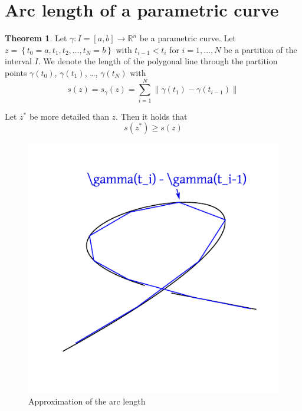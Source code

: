 \documentclass[a4paper,landscape,twocolumn]{article}
\theoremstyle{definition}
\newtheorem{theorem}{Theorem}
\newcommand\set[1]{\left\{#1\right\}}
\newcommand\norm[1]{\left\|#1\right\|}
\begin{document}
\section{Arc length of a parametric curve}
%
\begin{theorem}
  Let $\gamma: I = [a,b] \to \mathbb R^n$ be a parametric curve.
  Let $z = \set{t_0 = a, t_1, t_2, \ldots, t_N = b}$ with $t_{i-1} < t_i$
  for $i = 1, \ldots, N$ be a partition of the interval $I$.
  We denote the length of the polygonal line through the partition points
  $\gamma(t_0)$, $\gamma(t_1)$, \ldots, $\gamma(t_N)$ with
  \[ s(z) = s_{\gamma}(z) = \sum_{i=1}^{N} \norm{\gamma(t_1) - \gamma(t_{i-1})} \]

  Let $z^*$ be more detailed than $z$. Then it holds that
  \[ s(z^*) \geq s(z) \]
\end{theorem}
\begin{figure}[!h]
  \begin{center}
    \includegraphics{img/arc.pdf}
    \caption{Approximation of the arc length}
  \end{center}
\end{figure}
\end{document}
